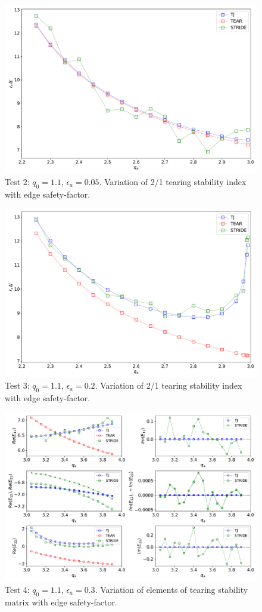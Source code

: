 \documentclass[12pt,prb,aps,notitlepage]{revtex4-1}
\begin{document}
\begin{figure}
\centerline{\includegraphics[width=\textwidth]{Test2.pdf}}
\caption{Test 2: $q_0=1.1$, $\epsilon_a=0.05$. Variation of 2/1 tearing stability index with edge safety-factor.}
\end{figure}

\begin{figure}
\centerline{\includegraphics[width=\textwidth]{Test3.pdf}}
\caption{Test 3:  $q_0=1.1$, $\epsilon_a=0.2$. Variation of 2/1 tearing stability index with edge safety-factor.}
\end{figure}

\begin{figure}
\centerline{\includegraphics[width=\textwidth]{Test4.pdf}}
\caption{Test 4:  $q_0=1.1$, $\epsilon_a=0.3$. Variation of elements of tearing stability matrix with edge safety-factor.}
\end{figure}
\end{document}
